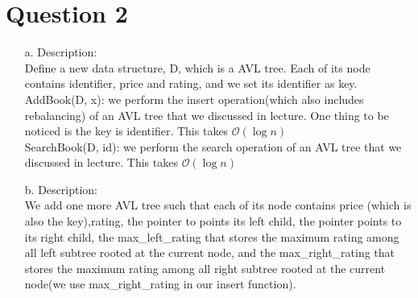 \documentclass[10pt]{article}
\begin{document}
\section*{Question 2}
\begin{enumerate}
\item[a.]Description:\\
Define a new data structure, D, which is a AVL tree. Each of its node contains identifier, price and rating, and we set its identifier as key.\\
AddBook(D, x): we perform the insert operation(which also includes rebalancing) of an AVL tree that we discussed in lecture. One thing to be noticed is the key is identifier. This takes $\mathcal{O}(\log{}n)$\\
SearchBook(D, id): we perform the search operation of an AVL tree that we discussed in lecture. This takes $\mathcal{O}(\log{}n)$\\
\item[b.]
Description:\\
We add one more AVL tree such that each of its node contains price (which is also the key),rating, the pointer to points its left child, the pointer points to its right child, the max\_left\_rating that stores the maximum rating among all left subtree rooted at the current node, and the max\_right\_rating that stores the maximum rating among all right subtree rooted at the current node(we use max\_right\_rating in our insert function).\\


\end{enumerate}
\end{document}
